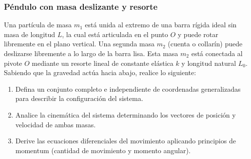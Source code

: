 \subsubsection{Péndulo con masa deslizante y resorte}

Una partícula de masa $m_1$ está unida al extremo de una barra rígida ideal sin masa de longitud $L$, la cual está articulada en el punto $O$ y puede rotar libremente en el plano vertical. Una segunda masa $m_2$ (cuenta o collarín) puede deslizarse libremente a lo largo de la barra lisa. Esta masa $m_2$ está conectada al pivote $O$ mediante un resorte lineal de constante elástica $k$ y longitud natural $L_0$. Sabiendo que la gravedad actúa hacia abajo, realice lo siguiente:

\begin{enumerate}
    \item Defina un conjunto completo e independiente de coordenadas generalizadas para describir la configuración del sistema.
    \item Analice la cinemática del sistema determinando los vectores de posición y velocidad de ambas masas.
    \item Derive las ecuaciones diferenciales del movimiento aplicando principios de momentum (cantidad de movimiento y momento angular).
\end{enumerate}

